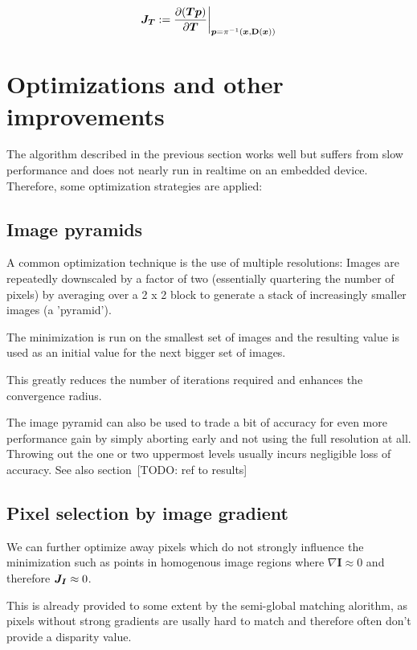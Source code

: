 \begin{equation}
    \mat{J_T} := \frac{\partial (\vec{T} \vec{p})}{\partial \vec{T}}
    \bigg|_{\vec{p} = \pi^{-1}(\vec{x}, \mathbf{D}(\vec{x}))}
\end{equation}






\section{Optimizations and other improvements}
\label{sec:optimizations}

The algorithm described in the previous section works well but suffers from
slow performance and does not nearly run in realtime on an embedded device.
Therefore, some optimization strategies are applied:

\subsection{Image pyramids}

A common optimization technique is the use of multiple resolutions: Images are
repeatedly downscaled by a factor of two (essentially quartering the number of
pixels) by averaging over a 2 x 2 block to generate a stack of increasingly
smaller images (a 'pyramid').

The minimization is run on the smallest set of images and the resulting value
is used as an initial value for the next bigger set of images.

This greatly reduces the number of iterations required and enhances the
convergence radius.

The image pyramid can also be used to trade a bit of accuracy for even more
performance gain by simply aborting early and not using the full resolution at
all. Throwing out the one or two uppermost levels usually incurs negligible
loss of accuracy. See also section~[TODO: ref to results] 


\subsection{Pixel selection by image gradient}
\label{subsec:gradient_filtering}

We can further optimize away pixels which do not strongly influence the
minimization such as points in homogenous image regions where $\nabla
\mathbf{I} \approx 0$ and therefore $\mat{J_I} \approx 0$.

This is already provided to some extent by the semi-global matching alorithm,
as pixels without strong gradients are usally hard to match and therefore often
don't provide a disparity value.

